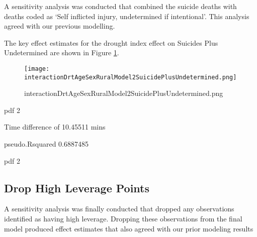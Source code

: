 \documentclass[a4paper]{article}                %
\begin{document}

        A sensitivity analysis was conducted that combined the suicide deaths with deaths coded as `Self inflicted injury, undetermined if intentional'. This analysis agreed with our previous modelling.

        The key effect estimates for the drought index effect on Suicides Plus Undetermined are shown in Figure \ref{fig:interactionDrtAgeSexRuralModel2SuicidePlusUndetermined.png}.

        \begin{figure}[!h]
        \centering
        \texttt{[image: interactionDrtAgeSexRuralModel2SuicidePlusUndetermined.png]}
        \caption{interactionDrtAgeSexRuralModel2SuicidePlusUndetermined.png}
        \label{fig:interactionDrtAgeSexRuralModel2SuicidePlusUndetermined.png}
        \end{figure}
        \clearpage


\begin{Schunk}
\begin{Soutput}
pdf 
  2 
\end{Soutput}
\begin{Soutput}
Time difference of 10.45511 mins
\end{Soutput}
\begin{Soutput}
pseudo.Rsquared 
      0.6887485 
\end{Soutput}
\begin{Soutput}
pdf 
  2 
\end{Soutput}
\end{Schunk}

\subsection{Drop High Leverage Points}


        A sensitivity analysis was finally conducted that dropped any observations identified as having high leverage. Dropping these observations from the final model produced effect estimates that also agreed with our prior modeling results
\end{document}
